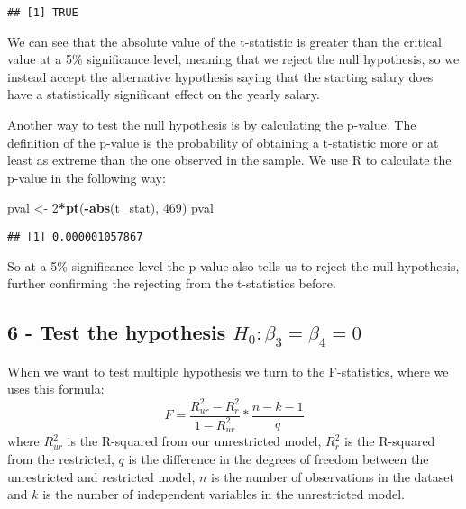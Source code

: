 \documentclass[
]{article}
\newenvironment{Shaded}{\begin{snugshade}}{\end{snugshade}}
\newcommand{\DecValTok}[1]{\textcolor[rgb]{0.00,0.00,0.81}{#1}}
\newcommand{\FunctionTok}[1]{\textcolor[rgb]{0.13,0.29,0.53}{\textbf{#1}}}
\newcommand{\NormalTok}[1]{#1}
\newcommand{\OtherTok}[1]{\textcolor[rgb]{0.56,0.35,0.01}{#1}}
\newcommand{\SpecialCharTok}[1]{\textcolor[rgb]{0.81,0.36,0.00}{\textbf{#1}}}
\begin{document}
\begin{verbatim}
## [1] TRUE
\end{verbatim}

We can see that the absolute value of the t-statistic is greater than
the critical value at a 5\% significance level, meaning that we reject
the null hypothesis, so we instead accept the alternative hypothesis
saying that the starting salary does have a statistically significant
effect on the yearly salary.

Another way to test the null hypothesis is by calculating the p-value.
The definition of the p-value is the probability of obtaining a
t-statistic more or at least as extreme than the one observed in the
sample. We use R to calculate the p-value in the following way:

\begin{Shaded}
\begin{Highlighting}[]
\NormalTok{pval }\OtherTok{\textless{}{-}} \DecValTok{2}\SpecialCharTok{*}\FunctionTok{pt}\NormalTok{(}\SpecialCharTok{{-}}\FunctionTok{abs}\NormalTok{(t\_stat), }\DecValTok{469}\NormalTok{)}
\NormalTok{pval}
\end{Highlighting}
\end{Shaded}

\begin{verbatim}
## [1] 0.000001057867
\end{verbatim}

So at a 5\% significance level the p-value also tells us to reject the
null hypothesis, further confirming the rejecting from the t-statistics
before.

\subsection{\texorpdfstring{6 - Test the hypothesis
\(H_0: \beta_3 = \beta_4 = 0\)}{6 - Test the hypothesis H\_0: \textbackslash beta\_3 = \textbackslash beta\_4 = 0}}\label{test-the-hypothesis-h_0-beta_3-beta_4-0}

When we want to test multiple hypothesis we turn to the F-statistics,
where we uses this formula:
\[F=\frac{R^2_{ur}-R^2_{r}}{1-R^2_{ur}}*\frac{n-k-1}{q}\] where
\(R^2_{ur}\) is the R-squared from our unrestricted model, \(R^2_{r}\)
is the R-squared from the restricted, \(q\) is the difference in the
degrees of freedom between the unrestricted and restricted model, \(n\)
is the number of observations in the dataset and \(k\) is the number of
independent variables in the unrestricted model.
\end{document}
